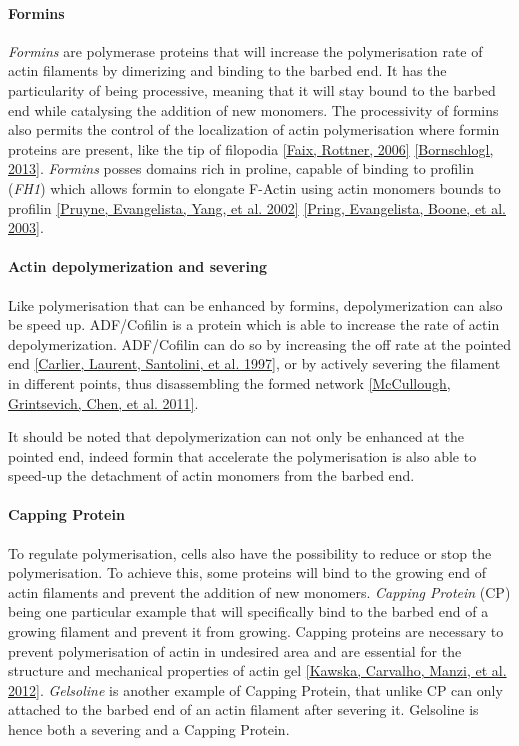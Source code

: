 \documentclass[A4paperpaper,11pt,english]{sphinxmanual}
\begin{document}
\paragraph{Formins}
\label{index-latex:formins}
\emph{Formins} are polymerase proteins that will increase the polymerisation rate
of actin filaments by dimerizing and binding to the barbed end. It has the
particularity of being processive, meaning that it will stay bound to the
barbed end while catalysing the addition of new monomers. The processivity of
formins also permits the control of the localization of actin polymerisation
where formin proteins are present, like the tip of filopodia {\hyperref[index-latex:faix2006]{{[}Faix, Rottner,  2006{]}}}
{\hyperref[index-latex:bornschlogl2013]{{[}Bornschlogl,  2013{]}}}. \emph{Formins} posses domains rich in proline, capable of
binding to profilin (\emph{FH1}) which allows formin to elongate F-Actin using actin
monomers bounds to profilin {\hyperref[index-latex:pruyne2002]{{[}Pruyne, Evangelista, Yang,  et al.  2002{]}}} {\hyperref[index-latex:pring2003a]{{[}Pring, Evangelista, Boone,  et al.  2003{]}}}.


\paragraph{Actin depolymerization and severing}
\label{index-latex:actin-depolymerization-and-severing}
Like polymerisation that can be enhanced by formins, depolymerization can also
be speed up. ADF/Cofilin is a protein which is able to increase the rate of
actin depolymerization. ADF/Cofilin can do so by increasing the off rate at
the pointed end {\hyperref[index-latex:carlier1997]{{[}Carlier, Laurent, Santolini,  et al.  1997{]}}}, or by actively severing the filament in
different points, thus disassembling the formed network {\hyperref[index-latex:mccullough2011]{{[}McCullough, Grintsevich, Chen,  et al.  2011{]}}}.

It should be noted that depolymerization can not only be  enhanced at the
pointed end, indeed formin that accelerate the polymerisation is also able to
speed-up the detachment of actin monomers from the barbed end.


\paragraph{Capping Protein}
\label{index-latex:capping-protein}
To regulate polymerisation, cells also have the possibility to reduce or stop
the polymerisation. To achieve this, some proteins will bind to the growing end
of actin filaments and prevent the addition of new monomers.  \emph{Capping Protein}
(CP) being one particular example that will specifically bind to the barbed end
of a growing filament and  prevent it from growing. Capping proteins are
necessary to prevent polymerisation of actin in undesired area
and are essential for the structure and mechanical properties of actin gel
{\hyperref[index-latex:kawska2012]{{[}Kawska, Carvalho, Manzi,  et al.  2012{]}}}. \emph{Gelsoline} is another example of Capping Protein, that
unlike CP can only attached to the barbed end of an actin filament after
severing it. Gelsoline is hence both a severing and a Capping Protein.
\end{document}
